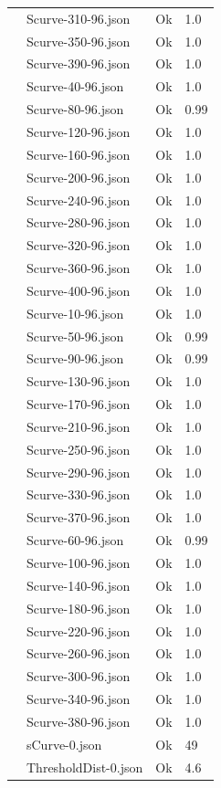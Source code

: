 \begin{longtable}{|llll|}
   & Scurve-310-96.json & Ok & 1.0 \\
   & Scurve-350-96.json & Ok & 1.0 \\
   & Scurve-390-96.json & Ok & 1.0 \\
   & Scurve-40-96.json & Ok & 1.0 \\
   & Scurve-80-96.json & Ok & 0.99 \\
   & Scurve-120-96.json & Ok & 1.0 \\
   & Scurve-160-96.json & Ok & 1.0 \\
   & Scurve-200-96.json & Ok & 1.0 \\
   & Scurve-240-96.json & Ok & 1.0 \\
   & Scurve-280-96.json & Ok & 1.0 \\
   & Scurve-320-96.json & Ok & 1.0 \\
   & Scurve-360-96.json & Ok & 1.0 \\
   & Scurve-400-96.json & Ok & 1.0 \\
   & Scurve-10-96.json & Ok & 1.0 \\
   & Scurve-50-96.json & Ok & 0.99 \\
   & Scurve-90-96.json & Ok & 0.99 \\
   & Scurve-130-96.json & Ok & 1.0 \\
   & Scurve-170-96.json & Ok & 1.0 \\
   & Scurve-210-96.json & Ok & 1.0 \\
   & Scurve-250-96.json & Ok & 1.0 \\
   & Scurve-290-96.json & Ok & 1.0 \\
   & Scurve-330-96.json & Ok & 1.0 \\
   & Scurve-370-96.json & Ok & 1.0 \\
   & Scurve-60-96.json & Ok & 0.99 \\
   & Scurve-100-96.json & Ok & 1.0 \\
   & Scurve-140-96.json & Ok & 1.0 \\
   & Scurve-180-96.json & Ok & 1.0 \\
   & Scurve-220-96.json & Ok & 1.0 \\
   & Scurve-260-96.json & Ok & 1.0 \\
   & Scurve-300-96.json & Ok & 1.0 \\
   & Scurve-340-96.json & Ok & 1.0 \\
   & Scurve-380-96.json & Ok & 1.0 \\
   & sCurve-0.json & Ok & 49 \\
   & ThresholdDist-0.json & Ok & 4.6 \\

\end{longtable}
